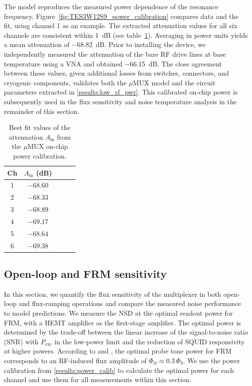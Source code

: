 \documentclass[
 prd,
 reprint,
 superscriptaddress,
 amsmath,amssymb,
 aps,
 floatfix,
]{revtex4-2}
\newcommand{\uMUX}{$\mu$MUX\xspace}
\begin{document}
The model reproduces the measured power dependence of the resonance frequency. Figure~\ref{fig:TES3W12S9_power_calibration} compares data and the fit, using channel 1 as an example. The extracted attenuation values for all six channels are consistent within \qty{1}{\dB} (see table~\ref{tab:pwr_attenuation}). Averaging in power units yields a mean attenuation of \qty{-68.82}{\dB}. Prior to installing the device, we independently measured the attenuation of the bare RF drive lines at base temperature using a VNA and obtained \qty{-66.15}{\dB}. The close agreement between these values, given additional losses from switches, connectors, and cryogenic components, validates both the \uMUX model and the circuit parameters extracted in \cref{results:low_rf_pwr}. This calibrated on-chip power is subsequently used in the flux sensitivity and noise temperature analysis in the remainder of this section.

\begin{table}[htb]
    \centering
    \begin{tabular}{c c c c c}
    \hline
         \small{Ch} & \small{$A_{\text{in}}$ (dB)}\\
    \hline
    1 & $-68.60$\\
    2 & $-68.33$\\
    3 & $-68.89$\\
    4 & $-69.17$\\
    5 & $-68.64$\\
    6 & $-69.38$\\
    \hline
    \end{tabular}
    \caption{Best fit values of the attenuation $A_{\text{in}}$ from the \uMUX on-chip power calibration.}
    \label{tab:pwr_attenuation}
\end{table}



\subsection{Open-loop and FRM sensitivity} \label{results:HEMT_noise}


In this section, we quantify the flux sensitivity of the multiplexer in both open-loop and flux-ramping operations and compare the measured noise performance to model predictions. We measure the NSD at the optimal readout power for FRM, with a HEMT amplifier as the first-stage amplifier. The optimal power is determined by the trade-off between the linear increase of the signal-to-noise ratio (SNR) with $P_{\mathrm{exc}}$ in the low-power limit and the reduction of SQUID responsivity at higher powers. According to \cite{mates_simultaneous_2017} and \cite{schuster_simulation_2023}, the optimal probe tone power for FRM corresponds to an RF-induced flux amplitude of \mbox{$\Phi_{\mathrm{rf}} \approx 0.3\,\Phi_0$}. We use the power calibration from \cref{results:power_calib} to calculate the optimal power for each channel and use them for all measurements within this section.
\end{document}

